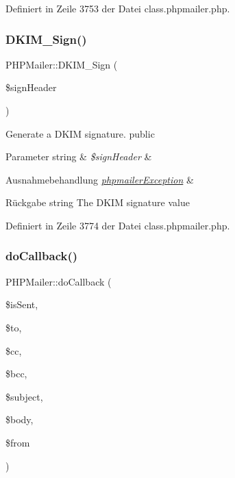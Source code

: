 Definiert in Zeile 3753 der Datei class.\+phpmailer.\+php.

\mbox{\label{class_p_h_p_mailer_a1a20762f9d24610dbc042df09a161564}} 
\subsubsection{\texorpdfstring{D\+K\+I\+M\+\_\+\+Sign()}{DKIM\_Sign()}}
{\footnotesize\ttfamily P\+H\+P\+Mailer\+::\+D\+K\+I\+M\+\_\+\+Sign (\begin{DoxyParamCaption}\item[{}]{\$sign\+Header }\end{DoxyParamCaption})}

Generate a D\+K\+IM signature.  public 
\begin{DoxyParams}[1]{Parameter}
string & {\em \$sign\+Header} & \\
\hline
\end{DoxyParams}

\begin{DoxyExceptions}{Ausnahmebehandlung}
{\em \mbox{\hyperlink{classphpmailer_exception}{phpmailer\+Exception}}} & \\
\hline
\end{DoxyExceptions}
\begin{DoxyReturn}{Rückgabe}
string The D\+K\+IM signature value 
\end{DoxyReturn}


Definiert in Zeile 3774 der Datei class.\+phpmailer.\+php.

\mbox{\label{class_p_h_p_mailer_ac4ce55222eb113ec8a637fc4db518de7}} 
\subsubsection{\texorpdfstring{do\+Callback()}{doCallback()}}
{\footnotesize\ttfamily P\+H\+P\+Mailer\+::do\+Callback (\begin{DoxyParamCaption}\item[{}]{\$is\+Sent,  }\item[{}]{\$to,  }\item[{}]{\$cc,  }\item[{}]{\$bcc,  }\item[{}]{\$subject,  }\item[{}]{\$body,  }\item[{}]{\$from }\end{DoxyParamCaption})\hspace{0.3cm}{\ttfamily [protected]}}

